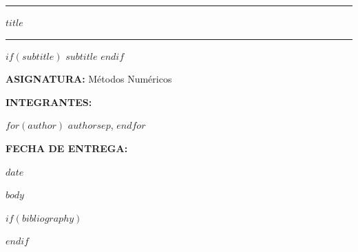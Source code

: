 \documentclass[12pt]{report}
\begin{document}

\thispagestyle{empty}

\vspace*{2cm}

\begin{center}

\noindent\rule{\textwidth}{0.4pt}

\vspace{0.5cm}

{\Huge\bfseries $title$}

\vspace{0.5cm}

\noindent\rule{\textwidth}{0.4pt}

$if(subtitle)$
\vspace{0.5cm}
{\large $subtitle$}
$endif$

\vspace{2cm}

\textbf{ASIGNATURA:} Métodos Numéricos

\vspace{0.5cm}

\textbf{INTEGRANTES:}

$for(author)$
$author$$sep$, 
$endfor$

\vspace{2cm}

\textbf{FECHA DE ENTREGA:}

$date$

\end{center}

\newpage


\tableofcontents
\thispagestyle{empty}

\newpage


\setcounter{page}{1}

$body$


$if(bibliography)$

\renewcommand{\bibname}{\MakeUppercase{REFERENCIAS}}



$endif$
\end{document}
